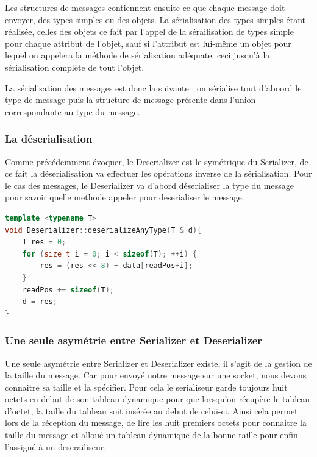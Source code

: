 \documentclass[a4paper, 12pt]{article}
\begin{document}
			Les structures de messages contiennent ensuite ce que chaque message doit envoyer, des types simples ou des objets. La sérialisation des types simples étant réalisée, celles des objets ce fait par l'appel de la sérailisation de types simple pour chaque attribut de l'objet, sauf si l'attribut est lui-même un objet pour lequel on appelera la méthode de sérialisation adéquate, ceci jusqu'à la sérialisation complète de tout l'objet.
			

			La sérialisation des messages est donc la suivante : on sérialise tout d'aboord le type de message puis la structure de message présente dans l'union correspondante au type du message.

			\subsubsection{La déserialisation}

			Comme précédemment évoquer, le Deserializer est le symétrique du Serializer, de ce fait la déserialisation va effectuer les opérations inverse de la sérialisation. Pour le cas des messages, le Deserializer va d'abord déserialiser la type du message pour savoir quelle methode appeler pour deserialiser le message.

\begin{lstlisting}[language=C++, caption=Méthode de desérailisation de type simple\, data est notre tableau dynamique\, d la varaible de type T à desérailiser et readPos la position de lecture du desérialiseur]
template <typename T>
void Deserializer::deserializeAnyType(T & d){
	T res = 0;
	for (size_t i = 0; i < sizeof(T); ++i) {
		res = (res << 8) + data[readPos+i];
	}
	readPos += sizeof(T);
	d = res;
}\end{lstlisting}

			\subsubsection{Une seule asymétrie entre Serializer et Deserializer}

			Une seule asymétrie entre Serializer et Deserializer existe, il s'agit de la gestion de la taille du message. Car pour envoyé notre message sur une socket, nous devons connaitre sa taille et la spécifier. Pour cela le serialiseur garde toujours huit octets en debut de son tableau dynamique pour que lorsqu'on récupère le tableau d'octet, la taille du tableau soit insérée au debut de celui-ci. Ainsi cela permet lors de la réception du message, de lire les huit premiers octets pour connaitre la taille du message et alloué un tableau dynamique de la bonne taille pour enfin l'assigné à un deserailiseur.
\end{document}
